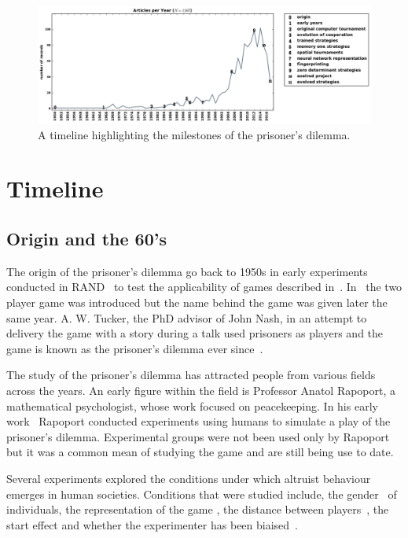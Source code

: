 \documentclass{article}
\begin{document}
\begin{figure}[!htbp]
    \centering
    \includegraphics[width=\textwidth]{assets/images/timeline.pdf}
    \caption{\label{fig:timeline} A timeline highlighting the milestones of the 
    prisoner's dilemma.}
\end{figure}

\section{Timeline}\label{section:timeline}

\subsection{Origin and the 60's}

The origin of the prisoner's dilemma go back to 1950s in early experiments
conducted in RAND~\cite{Flood1958} to test the applicability of games
described in~\cite{VonNeumann1944}. In~\cite{Flood1958} the two player game was
introduced but the name behind the game was given later the same year. 
A. W. Tucker, the PhD advisor of John Nash, in an attempt to delivery the game
with a story during a talk used prisoners as players and the game is known as 
the prisoner's dilemma ever since~\cite{Tucker1983}.

The study of the prisoner's dilemma has attracted people from various fields
across the years. An early figure within the field is Professor Anatol Rapoport,
a mathematical psychologist, whose work focused on peacekeeping.
In his early work~\cite{rapoport1965} Rapoport conducted experiments using humans
to simulate a play of the prisoner's dilemma. Experimental groups were not been
used only by Rapoport but it was a common mean of studying the game
\cite{Evans1966, Gallo1968, Lutzker1961, Mack1971, Sensenig1972} and are still
being use to date. %

Several experiments explored the conditions under which altruist behaviour emerges
in human societies. Conditions that were studied include, the gender~\cite{Evans1966,
Lutzker1961, Mack1971} of individuals, the representation of the game
\cite{Evans1966}, the distance between players~\cite{Sensenig1972}, the start effect
\cite{Tedeschi1968} and whether the experimenter has been biaised~\cite{Gallo1968}.
\end{document}
